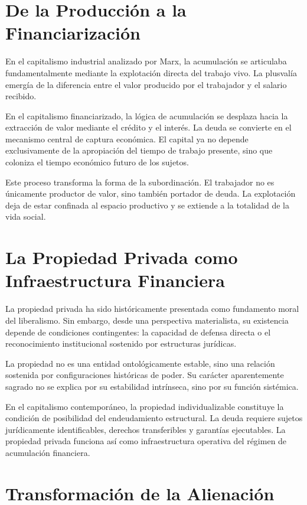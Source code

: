 \documentclass[12pt,a4paper]{article}
\begin{document}
\section{De la Producción a la Financiarización}

En el capitalismo industrial analizado por Marx, la acumulación se articulaba fundamentalmente mediante la explotación directa del trabajo vivo. La plusvalía emergía de la diferencia entre el valor producido por el trabajador y el salario recibido.

En el capitalismo financiarizado, la lógica de acumulación se desplaza hacia la extracción de valor mediante el crédito y el interés. La deuda se convierte en el mecanismo central de captura económica. El capital ya no depende exclusivamente de la apropiación del tiempo de trabajo presente, sino que coloniza el tiempo económico futuro de los sujetos.

Este proceso transforma la forma de la subordinación. El trabajador no es únicamente productor de valor, sino también portador de deuda. La explotación deja de estar confinada al espacio productivo y se extiende a la totalidad de la vida social.

\section{La Propiedad Privada como Infraestructura Financiera}

La propiedad privada ha sido históricamente presentada como fundamento moral del liberalismo. Sin embargo, desde una perspectiva materialista, su existencia depende de condiciones contingentes: la capacidad de defensa directa o el reconocimiento institucional sostenido por estructuras jurídicas.

La propiedad no es una entidad ontológicamente estable, sino una relación sostenida por configuraciones históricas de poder. Su carácter aparentemente sagrado no se explica por su estabilidad intrínseca, sino por su función sistémica.

En el capitalismo contemporáneo, la propiedad individualizable constituye la condición de posibilidad del endeudamiento estructural. La deuda requiere sujetos jurídicamente identificables, derechos transferibles y garantías ejecutables. La propiedad privada funciona así como infraestructura operativa del régimen de acumulación financiera.

\section{Transformación de la Alienación}
\end{document}
